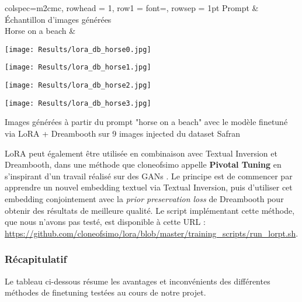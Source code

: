 \documentclass{article}
\begin{document}
\begin{table}[H]
    \centering
    \begin{tblr}{colspec={m{2cm}c},
    rowhead = 1,
    row{1} = {font=\bfseries},
    rowsep = 1pt
    }
    Prompt & Échantillon d'images générées \\
    Horse on a beach &
    \begin{minipage}{0.2\textwidth}
    \texttt{[image: Results/lora\_db\_horse0.jpg]}
    \end{minipage}
    \hspace{-0.2cm}
    \begin{minipage}{0.2\textwidth}
    \texttt{[image: Results/lora\_db\_horse1.jpg]}
    \end{minipage}
    \hspace{-0.2cm}
    \begin{minipage}{0.2\textwidth}
    \texttt{[image: Results/lora\_db\_horse2.jpg]}
    \end{minipage}
    \hspace{-0.2cm}
    \begin{minipage}{0.2\textwidth}
    \texttt{[image: Results/lora\_db\_horse3.jpg]}
    \end{minipage}
    \end{tblr}
    \caption{Images générées à partir du prompt "horse on a beach" avec le modèle finetuné via LoRA + Dreambooth sur 9 images injected du dataset Safran}
\end{table}

LoRA peut également être utilisée en combinaison avec Textual Inversion et Dreambooth, dans une méthode que cloneofsimo appelle \textbf{Pivotal Tuning} en s'inspirant d'un travail réalisé sur des GANs \cite{roich2021pivotal}. Le principe est de commencer par apprendre un nouvel embedding textuel via Textual Inversion, puis d'utiliser cet embedding conjointement avec la \textit{prior preservation loss} de Dreambooth pour obtenir des résultats de meilleure qualité. Le script implémentant cette méthode, que nous n'avons pas testé, est disponible à cette URL : \url{https://github.com/cloneofsimo/lora/blob/master/training_scripts/run_lorpt.sh}.


\subsubsection{Récapitulatif}

Le tableau ci-dessous résume les avantages et inconvénients des différentes méthodes de finetuning testées au cours de notre projet.
\end{document}

